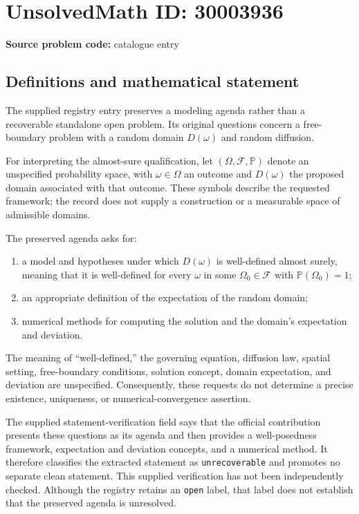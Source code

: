 \documentclass[11pt]{article}
\begin{document}
\section*{UnsolvedMath ID: 30003936}
\textbf{Source problem code:} catalogue entry
\subsection{Definitions and mathematical statement}
The supplied registry entry preserves a modeling agenda rather than a recoverable standalone open problem. Its original questions concern a free-boundary problem with a random domain \(D(\omega)\) and random diffusion.

For interpreting the almost-sure qualification, let \((\Omega,\mathcal F,\mathbb P)\) denote an unspecified probability space, with \(\omega\in\Omega\) an outcome and \(D(\omega)\) the proposed domain associated with that outcome. These symbols describe the requested framework; the record does not supply a construction or a measurable space of admissible domains.

The preserved agenda asks for:
\begin{enumerate}
\item a model and hypotheses under which \(D(\omega)\) is well-defined almost surely, meaning that it is well-defined for every \(\omega\) in some \(\Omega_0\in\mathcal F\) with \(\mathbb P(\Omega_0)=1\);
\item an appropriate definition of the expectation of the random domain;
\item numerical methods for computing the solution and the domain's expectation and deviation.
\end{enumerate}
The meaning of ``well-defined,'' the governing equation, diffusion law, spatial setting, free-boundary conditions, solution concept, domain expectation, and deviation are unspecified. Consequently, these requests do not determine a precise existence, uniqueness, or numerical-convergence assertion.

The supplied statement-verification field says that the official contribution presents these questions as its agenda and then provides a well-posedness framework, expectation and deviation concepts, and a numerical method. It therefore classifies the extracted statement as \texttt{unrecoverable} and promotes no separate clean statement. This supplied verification has not been independently checked. Although the registry retains an \texttt{open} label, that label does not establish that the preserved agenda is unresolved.
\end{document}
